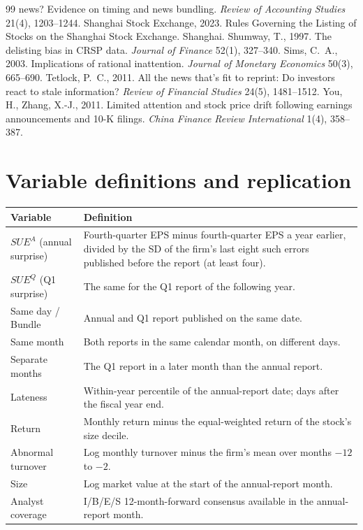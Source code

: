 \documentclass[11pt]{article}
\newcommand{\SUEA}{SUE^{A}}
\newcommand{\SUEQ}{SUE^{Q}}
\begin{document}
\begin{thebibliography}{99}
news? Evidence on timing and news bundling. \emph{Review of Accounting Studies} 21(4), 1203--1244.
 Shanghai Stock Exchange, 2023. Rules Governing the Listing of Stocks
on the Shanghai Stock Exchange. Shanghai.
 Shumway, T., 1997. The delisting bias in CRSP data. \emph{Journal of Finance}
52(1), 327--340.
 Sims, C.~A., 2003. Implications of rational inattention. \emph{Journal of Monetary
Economics} 50(3), 665--690.
 Tetlock, P.~C., 2011. All the news that's fit to reprint: Do investors react to
stale information? \emph{Review of Financial Studies} 24(5), 1481--1512.
 You, H., Zhang, X.-J., 2011. Limited attention and stock price drift following
earnings announcements and 10-K filings. \emph{China Finance Review International} 1(4), 358--387.
\end{thebibliography}

\appendix
\normalsize
\section{Variable definitions and replication}

\begin{table}[h]
\centering\footnotesize
\begin{tabular}{p{3.4cm}p{11.6cm}}
\toprule
Variable & Definition\\
\midrule
$\SUEA$ (annual surprise) & Fourth-quarter EPS minus fourth-quarter EPS a year earlier, divided by the SD of the
firm's last eight such errors published before the report (at least four).\\
$\SUEQ$ (Q1 surprise) & The same for the Q1 report of the following year.\\
Same day / Bundle & Annual and Q1 report published on the same date.\\
Same month & Both reports in the same calendar month, on different days.\\
Separate months & The Q1 report in a later month than the annual report.\\
Lateness & Within-year percentile of the annual-report date; days after the fiscal year end.\\
Return & Monthly return minus the equal-weighted return of the stock's size decile.\\
Abnormal turnover & Log monthly turnover minus the firm's mean over months $-12$ to $-2$.\\
Size & Log market value at the start of the annual-report month.\\
Analyst coverage & I/B/E/S 12-month-forward consensus available in the annual-report month.\\
\bottomrule
\end{tabular}
\end{table}
\end{document}
